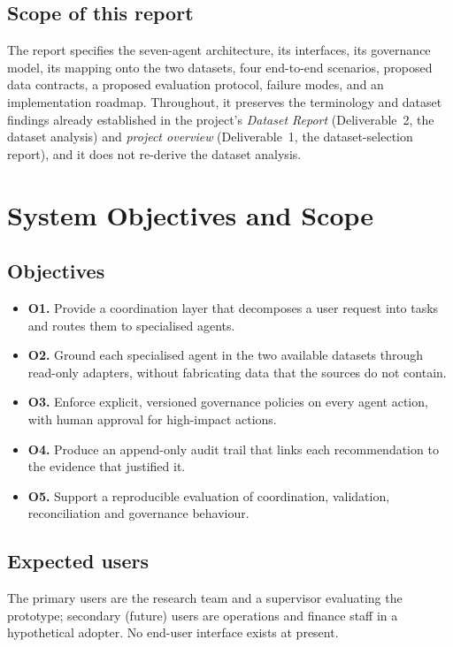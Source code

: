 \documentclass[11pt,a4paper]{article}
\begin{document}
\subsection{Scope of this report}
The report specifies the seven-agent architecture, its interfaces, its governance model, its mapping onto the two datasets, four end-to-end scenarios, proposed data contracts, a proposed evaluation protocol, failure modes, and an implementation roadmap. Throughout, it preserves the terminology and dataset findings already established in the project's \emph{Dataset Report} (Deliverable~2, the dataset analysis) and \emph{project overview} (Deliverable~1, the dataset-selection report), and it does not re-derive the dataset analysis.

\section{System Objectives and Scope}
\subsection{Objectives}
\begin{itemize}
\item \textbf{O1.} Provide a coordination layer that decomposes a user request into tasks and routes them to specialised agents.
\item \textbf{O2.} Ground each specialised agent in the two available datasets through read-only adapters, without fabricating data that the sources do not contain.
\item \textbf{O3.} Enforce explicit, versioned governance policies on every agent action, with human approval for high-impact actions.
\item \textbf{O4.} Produce an append-only audit trail that links each recommendation to the evidence that justified it.
\item \textbf{O5.} Support a reproducible evaluation of coordination, validation, reconciliation and governance behaviour.
\end{itemize}

\subsection{Expected users}
The primary users are the research team and a supervisor evaluating the prototype; secondary (future) users are operations and finance staff in a hypothetical adopter. No end-user interface exists at present.
\end{document}
